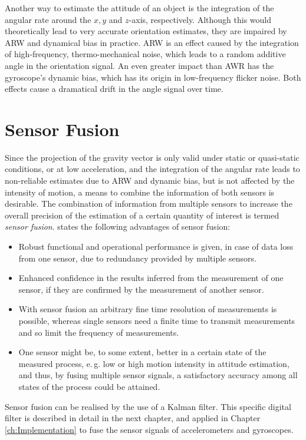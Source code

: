 Another way to estimate the attitude of an object is the integration of the angular rate around the $x, y$ and $z$-axis, respectively. Although this would theoretically lead to very accurate orientation estimates, they are impaired by \gls{ARW} and dynamical bias in practice. \gls{ARW} is an effect caused by the integration of high-frequency, thermo-mechanical noise, which leads to a random additive angle in the orientation signal. An even greater impact than AWR has the gyroscope's dynamic bias, which has its origin in low-frequency flicker noise. Both effects cause a dramatical drift in the angle signal over time.

\section{Sensor Fusion}

Since the projection of the gravity vector is only valid under static or quasi-static conditions, or at low acceleration, and the integration of the angular rate leads to non-reliable estimates due to \gls{ARW} and dynamic bias, but is not affected by the intensity of motion, a means to combine the information of both sensors is desirable. The combination of information from multiple sensors to increase the overall precision of the estimation of a certain quantity of interest is termed \emph{sensor fusion}. \citeauthor{raol2009multi} \cite{raol2009multi} states the following advantages of sensor fusion:
 
\begin{itemize}
\item Robust functional and operational performance is given, in case of data loss from one sensor, due to redundancy provided by multiple sensors.
\item Enhanced confidence in the results inferred from the measurement of one sensor, if they are confirmed by the measurement of another sensor.
\item With sensor fusion an arbitrary fine time resolution of measurements is possible, whereas single sensors need a finite time to transmit measurements and so limit the frequency of measurements.
\item One sensor might be, to some extent, better in a certain state of the measured process, e.\,g. low or high motion intensity in attitude estimation, and thus, by fusing multiple sensor signals, a satisfactory accuracy among all states of the process could be attained.
\end{itemize}

\noindent
Sensor fusion can be realised by the use of a Kalman filter. This specific digital filter is described in detail in the next chapter, and applied in Chapter \ref{ch:Implementation} to fuse the sensor signals of accelerometers and gyroscopes.


